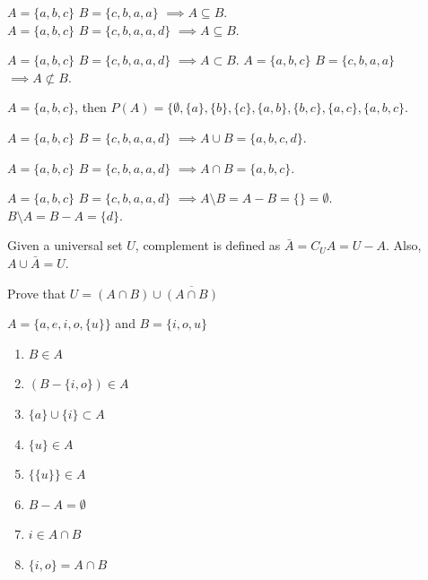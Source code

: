 \begin{definition}
  $A = \{a, b, c\}$ $B=\{c, b, a, a\}$ $\implies A\subseteq B$.\\
  $A = \{a, b, c\}$ $B=\{c, b, a, a, d\}$ $\implies A\subseteq B$.
\end{definition}

\begin{definition}
  $A = \{a, b, c\}$ $B=\{c, b, a, a, d\}$ $\implies A\subset B$.
  $A = \{a, b, c\}$ $B=\{c, b, a, a\}$ $\implies A \not\subset B$.\\
\end{definition}

\begin{definition}
  $A = \{a,b, c\}$, then $P(A) = \{\emptyset, \{a\}, \{b\}, \{c\}, \{a, b\}, \{b, c\}, \{a, c\}, \{a, b, c\}$.
\end{definition}

\begin{definition}
  $A = \{a, b, c\}$ $B=\{c, b, a, a, d\}$ $\implies A\cup B = \{a, b, c, d\}$.
\end{definition}

\begin{definition}
  $A = \{a, b, c\}$ $B=\{c, b, a, a, d\}$ $\implies A\cap B = \{a, b, c\}$.
\end{definition}

\begin{definition}
  $A = \{a, b, c\}$ $B=\{c, b, a, a, d\}$ $\implies A\setminus B = A-B = \{\} = \emptyset$.\\
  $B\setminus A = B-A = \{d\}$.\\
\end{definition}

\begin{definition}
  Given a universal set $U$, complement is defined as $\bar{A} = C_U A= U - A$. Also, $A \cup \bar{A} = U$.
\end{definition}


\begin{example}
  Prove that  $U = (A\cap B) \cup \overline{(A\cap B)}$
\end{example}

\begin{example}
  $A=\{a,e,i,o,\{u\}\}$ and $B = \{i, o,  u\}$
  \begin{enumerate}
    \item $B  \in A$
    \item $(B - \{i, o\}) \in  A$
    \item $\{a\} \cup \{i\} \subset A$
    \item $\{u\} \in A$
    \item $\{\{u\}\} \in  A$
    \item $B - A =  \emptyset$
    \item $i \in A \cap B$
    \item $\{i, o\} = A\cap B$
  \end{enumerate}
\end{example}


